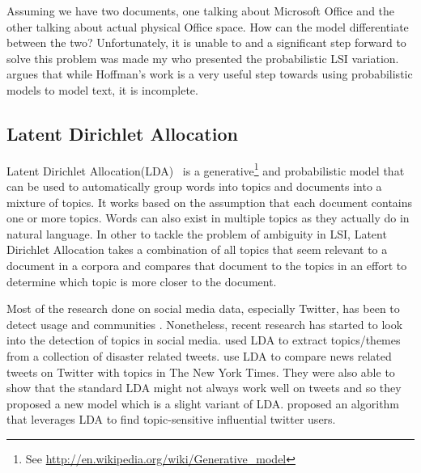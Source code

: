 Assuming we have two documents, one talking about Microsoft Office and the other talking about
actual physical Office space. How can the model differentiate between the two? Unfortunately, it is
unable to and a significant step forward to solve this problem was made my
\cite{hofmann1999probabilistic} who presented the probabilistic LSI variation. \cite{blei2003latent}
argues that while Hoffman's work is a very useful step towards using probabilistic models to model
text, it is incomplete.

\subsection{Latent Dirichlet Allocation}
\label{sub:bg_lda}
Latent Dirichlet Allocation(LDA)~\cite{blei2003latent} is a generative\footnote{See
\url{http://en.wikipedia.org/wiki/Generative_model}} and probabilistic model that can be used to
automatically group words into topics and documents into a mixture of topics. It works based on the
assumption that each document contains one or more topics. Words can also exist in multiple topics
as they actually do in natural language. In other to tackle the problem of ambiguity in LSI, Latent
Dirichlet Allocation takes a combination of all topics that seem relevant to a document in a corpora
and compares that document to the topics in an effort to determine which topic is more closer to the
document.

Most of the research done on social media data, especially Twitter, has been to detect usage and
communities \cite{java2007we}. Nonetheless, recent research has started to look into the detection
of topics in social media. \cite{kireyev2009applications} used LDA to extract topics/themes from a
collection of disaster related tweets. \cite{zhao2011comparing} use LDA to compare news related
tweets on Twitter with topics in The New York Times. They were also able to show that the standard
LDA might not always work well on tweets and so they proposed a new model which is a slight variant
of LDA. \cite{weng2010twitterrank} proposed an algorithm that leverages LDA to find topic-sensitive
influential twitter users.

